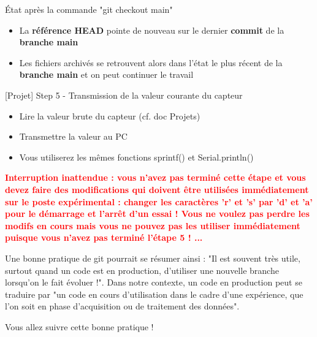\documentclass[a4paper,11pt]{beamer}
\begin{document}
\begin{frame}
\begin{block}{État après la commande "git checkout main"}
\centering
{}
\begin{itemize}
	\item La \textbf{référence HEAD} pointe de nouveau sur le dernier \textbf{commit} de la \textbf{branche main}
	\item Les fichiers archivés se retrouvent alors dans l'état le plus récent de la \textbf{branche main} et on peut continuer le travail 
\end{itemize}
\end{block}
\end{frame}


\begin{frame}

\begin{exampleblock}{[Projet] Step 5 - Transmission de la valeur courante du capteur}
\begin{itemize}
\item Lire la valeur brute du capteur (cf. doc Projets)
\item Transmettre la valeur au PC
\item Vous utiliserez les mêmes fonctions sprintf() et Serial.println()
\end{itemize}
\end{exampleblock}

\justifying
\textcolor{red}{\textbf{Interruption inattendue : vous n'avez pas terminé cette étape et vous devez faire des modifications qui doivent être utilisées immédiatement sur le poste expérimental : changer les caractères 'r' et 's' par 'd' et 'a' pour le démarrage et l'arrêt d'un essai ! Vous ne voulez pas perdre les modifs en cours mais vous ne pouvez pas les utiliser immédiatement puisque vous n'avez pas terminé l'étape 5 ! ...}}
\end{frame}

\begin{frame}
\justifying
Une bonne pratique de git pourrait se résumer ainsi : "Il est souvent très utile, surtout quand un code est en production, d'utiliser une nouvelle branche lorsqu'on le fait évoluer !". Dans notre contexte, un code en production peut se traduire par "un code en cours d'utilisation dans le cadre d'une expérience, que l'on soit en phase d'acquisition ou de traitement des données". 
\vspace{1cm}

\centering
Vous allez suivre cette bonne pratique !
\end{frame}
\end{document}
